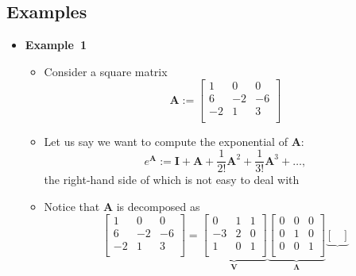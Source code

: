 \documentclass[12pt,a4paper]{article}
\begin{document}
\subsection{Examples}

\begin{itemize}

\item \textbf{Example~1}
  \begin{itemize}
  \item Consider a square matrix
    \begin{equation}\nonumber%
      \bm{A} :=
      \begin{bmatrix}
        1 & 0 & 0 \\
        6 & -2 & -6 \\
        -2 & 1 & 3 \\
      \end{bmatrix}
    \end{equation}
  \item Let us say we want to compute the exponential of $\bm{A}$:
    \begin{equation}\nonumber%
      e^{\bm{A}} := \bm{I} + \bm{A} + \frac{1}{2!}\bm{A}^{2} + \frac{1}{3!}\bm{A}^{3} + \ldots,
    \end{equation}
    the right-hand side of which is not easy to deal with
  \item Notice that $\bm{A}$ is decomposed as
    \begin{equation}\nonumber%
      \begin{bmatrix}
        1 & 0 & 0 \\
        6 & -2 & -6 \\
        -2 & 1 & 3 \\
      \end{bmatrix}
      =
      \underbrace{
      \begin{bmatrix}
        0 & 1 & 1 \\
        -3 & 2 & 0\\
        1 & 0 & 1 \\
      \end{bmatrix}}_{\bm{V}}
    \underbrace{
      \begin{bmatrix}
        0 & 0 & 0 \\
        0 & 1 & 0 \\
        0 & 0 & 1 \\
      \end{bmatrix}}_{\bm{\Lambda}}
    \underbrace{
      \begin{bmatrix}

\end{bmatrix}}
\end{equation}
\end{itemize}
\end{itemize}
\end{document}
